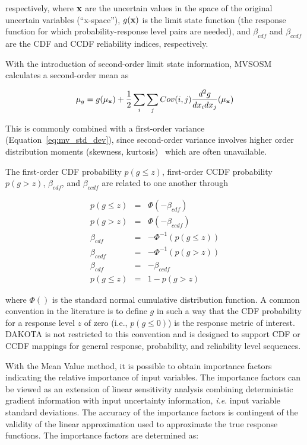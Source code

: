 respectively, where ${\bf x}$ are the uncertain values in the 
space of the original uncertain variables (``x-space''), $g({\bf x})$
is the limit state function (the response function for which
probability-response level pairs are needed), and $\beta_{cdf}$ and
$\beta_{ccdf}$ are the CDF and CCDF reliability indices, respectively.

With the introduction of second-order limit state information, MVSOSM
calculates a second-order mean as

\begin{equation}
\mu_g = g(\mu_{\bf x}) + \frac{1}{2} \sum_i \sum_j Cov(i,j) 
\frac{d^2g}{dx_i dx_j}(\mu_{\bf x}) \label{eq:mv_mean2}
\end{equation}

This is commonly combined with a first-order variance
(Equation~\ref{eq:mv_std_dev}), since second-order variance involves
higher order distribution moments (skewness, kurtosis)~\cite{Hal00}
which are often unavailable.

The first-order CDF probability $p(g \le z)$, first-order 
CCDF probability $p(g > z)$, $\beta_{cdf}$, and $\beta_{ccdf}$ are
related to one another through

\begin{eqnarray}
p(g \le z)   & = & \Phi(-\beta_{cdf})     \label{eq:p_cdf} \\
p(g > z)     & = & \Phi(-\beta_{ccdf})    \label{eq:p_ccdf} \\
\beta_{cdf}  & = & -\Phi^{-1}(p(g \le z)) \label{eq:beta_cdf} \\
\beta_{ccdf} & = & -\Phi^{-1}(p(g > z))   \label{eq:beta_ccdf} \\
\beta_{cdf}  & = & -\beta_{ccdf}          \label{eq:beta_cdf_ccdf} \\
p(g \le z)   & = & 1 - p(g > z)           \label{eq:p_cdf_ccdf}
\end{eqnarray}

where $\Phi()$ is the standard normal cumulative distribution
function.  A common convention in the literature is to define $g$ in
such a way that the CDF probability for a response level $z$ of zero
(i.e., $p(g \le 0)$) is the response metric of interest.  DAKOTA is
not restricted to this convention and is designed to support CDF or
CCDF mappings for general response, probability, and reliability level
sequences.

With the Mean Value method, it is possible to obtain 
importance factors indicating the relative importance of 
input variables.  The importance factors can be viewed
as an extension of linear sensitivity analysis combining deterministic
gradient information with input uncertainty information,
\emph{i.e}. input variable standard deviations. The accuracy of the
importance factors is contingent of the validity of the linear
approximation used to approximate the true response functions.
The importance factors are determined as: 

